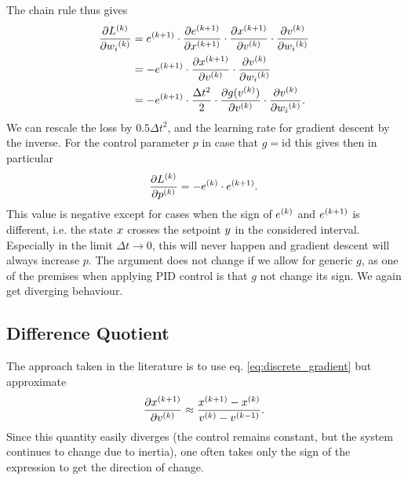 \documentclass{article}
\begin{document}
    The chain rule thus gives
    \begin{align}
        \frac{\partial {L}^{(k)}}{\partial {w_i}^{(k)}} &= {e}^{(k+1)} \cdot \frac{\partial {e}^{(k+1)}}{\partial {x}^{(k+1)}} 
                                                             \cdot \frac{\partial {x}^{(k+1)}}{\partial {v}^{(k)}} 
                                                             \cdot \frac{\partial {v}^{(k)}}{\partial {w_i}^{(k)}} \nonumber \\
         &= -{e}^{(k+1)} \cdot \frac{\partial {x}^{(k+1)}}{\partial {v}^{(k)}} 
                               \cdot \frac{\partial {v}^{(k)}}{\partial {w_i}^{(k)}} \label{eq:discrete_gradient} \\
                        &= -{e}^{(k+1)} \cdot \frac{\Delta t^2}{2} 
                                              \cdot \frac{\partial g({v}^{(k)})}{\partial {v}^{(k)}} 
                                              \cdot \frac{\partial {v}^{(k)}}{\partial {w_i}^{(k)}}.
    \end{align}
    We can rescale the loss by $0.5 \Delta t^2$, and the learning rate for gradient descent by the inverse. 
    For the control parameter $p$ in case that $g = \mathrm{id}$ this gives then in particular
    \begin{align}
        \frac{\partial {L}^{(k)}}{\partial {p}^{(k)}} = - {e}^{(k)} \cdot {e}^{(k+1)}. \label{eq:diverging_p_local}
    \end{align}
    This value is negative except for cases when the sign of ${e}^{(k)}$ and ${e}^{(k+1)}$ is different, 
    i.e. the state $x$ crosses the setpoint $y$ in the considered interval. 
    Especially in the limit $\Delta t \rightarrow 0$, this will never happen and gradient descent will 
    always increase $p$. The argument does not change if we allow for generic $g$, as one of the premises when applying 
    PID control is that $g$ not change its sign. We again get diverging behaviour.


  \subsection{Difference Quotient}
    The approach taken in the literature \cite{cong_novel_2005} is to use eq. \eqref{eq:discrete_gradient} but approximate 
    \begin{align}
        \frac{\partial {x}^{(k+1)}}{\partial {v}^{(k)}} \approx \frac{{x}^{(k+1)} - {x}^{(k)}}{{v}^{(k)} - {v}^{(k-1)}}.
    \end{align}
    Since this quantity easily diverges (the control remains constant, but the system continues to change due to inertia), 
    one often takes only the sign of the expression to get the direction of change. 
\end{document}
